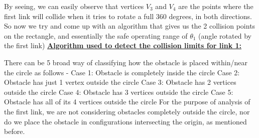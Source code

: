 \documentclass[12pt]{article}
\begin{document}
By seeing, we can easily observe that vertices $V_3$ and $V_4$ are the points where the first link will collide when it tries to rotate a full 360 degrees, in both directions. So now we try and come up with an algorithm that gives us the 2 collision points on the rectangle, and essentially the safe operating range of $\theta_1$ (angle rotated by the first link)
\clearpage
\underline{\textbf{Algorithm used to detect the collision limits for link 1:}}
\newline

There can be 5 broad way of classifying how the obstacle is placed within/near the circle as follows - 
\newline
Case 1: Obstacle is completely inside the circle
\newline
Case 2: Obstacle has just 1 vertex outside the circle
\newline
Case 3: Obstacle has 2 vertices outside the circle
\newline
Case 4: Obstacle has 3 vertices outside the circle
\newline
Case 5: Obstacle has all of its 4 vertices outside the circle
\newline
For the purpose of analysis of the first link, we are not considering obstacles completely outside the circle, nor do we place the obstacle in configurations intersecting the origin, as mentioned before.
\end{document}
